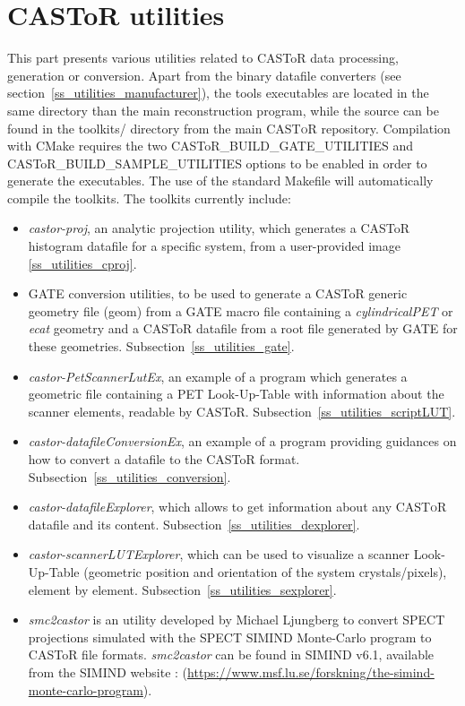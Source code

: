 \documentclass[a4paper, 11pt]{article}
\newcommand{\castor}{\textsc{CASToR}\xspace}
\begin{document}
\section{CASToR utilities}
\label{s_utilities}

This part presents various utilities related to CASToR data processing, generation or conversion. Apart from the binary datafile converters (see section~\ref{ss_utilities_manufacturer}), the tools executables are located in the same directory than the main reconstruction program, while the source can be found in the toolkits/ directory from the main \castor repository. Compilation with CMake requires the two  CASToR\_BUILD\_GATE\_UTILITIES and CASToR\_BUILD\_SAMPLE\_UTILITIES options to be enabled in order to generate the executables. The use of the standard Makefile will automatically compile the toolkits. The toolkits currently include:
\begin{itemize}
\ifdefined\dev
  \item \textit{castor-proj}, an analytic projection utility, which generates a CASToR histogram datafile for a specific system, from a user-provided image \ref{ss_utilities_cproj}.
\fi
  \item GATE conversion utilities, to be used to generate a CASToR generic geometry file (geom) from a GATE macro file containing a \textit{cylindricalPET}
        or \textit{ecat} geometry and a CASToR datafile from a root file generated by GATE for these geometries. Subsection~\ref{ss_utilities_gate}.
  \item \textit{castor-PetScannerLutEx}, an example of a program which generates a geometric file containing a PET Look-Up-Table with information
        about the scanner elements, readable by CASToR. Subsection~\ref{ss_utilities_scriptLUT}.
  \item \textit{castor-datafileConversionEx}, an example of a program providing guidances on how to convert a datafile to the CASToR format.
        Subsection~\ref{ss_utilities_conversion}.
  \item \textit{castor-datafileExplorer}, which allows to get information about any \castor datafile and its content. Subsection~\ref{ss_utilities_dexplorer}.
  \item \textit{castor-scannerLUTExplorer}, which can be used to visualize a scanner Look-Up-Table (geometric position and orientation of the system crystals/pixels), element by element. Subsection~\ref{ss_utilities_sexplorer}.
  \item \textit{smc2castor} is an utility developed by Michael Ljungberg to convert SPECT projections simulated with the SPECT SIMIND Monte-Carlo program to CASToR file formats. \textit{smc2castor} can be found in SIMIND v6.1, available from the SIMIND website : (\url{https://www.msf.lu.se/forskning/the-simind-monte-carlo-program}).
\end{itemize}
\end{document}
